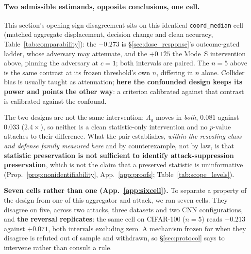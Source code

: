 \documentclass{article}
\begin{document}
\paragraph{Two admissible estimands, opposite conclusions, one cell.} This section's opening sign disagreement sits on this identical \texttt{coord\_median} cell (matched aggregate displacement, decision change and clean accuracy, Table~\ref{tab:comparability}): the $-0.273$ is §\ref{sec:dose_response}'s outcome-gated ladder, whose adversary may attenuate, and the $+0.125$ the Mode~S intervention above, pinning the adversary at $c{=}1$; both intervals are paired. The $n{=}5$ above is the same contrast at its frozen threshold's own $n$, differing in $n$ alone. Collider bias is usually taught as attenuation; \textbf{here the confounded design keeps its power and points the other way}: a criterion calibrated against that contrast is calibrated against the confound.

\noindent The two designs are not the same intervention: $\Lambda_a$ moves in \emph{both}, $0.081$ against $0.033$ ($2.4\times$), so neither is a clean statistic-only intervention and no $p$-value attaches to their difference. What the pair establishes, \emph{within the rescaling class and defense family measured here} and by counterexample, not by law, is that \textbf{statistic preservation is not sufficient to identify attack-suppression preservation}, which is not the claim that a preserved statistic is uninformative (Prop.~\ref{prop:nonidentifiability}, App.~\ref{app:proofs}; Table~\ref{tab:scope_levels}).

\noindent \textbf{Seven cells rather than one (App.~\ref{app:sixcell}).} To separate a property of the design from one of this aggregator and attack, we ran seven cells. They disagree on five, across two attacks, three datasets and two CNN configurations, and \textbf{the reversal replicates}: the same cell on CIFAR-100 ($n{=}5$) reads $-0.213$ against $+0.071$, both intervals excluding zero. A mechanism frozen for when they disagree is refuted out of sample and withdrawn, so §\ref{sec:protocol} says to intervene rather than consult a rule.
\end{document}
